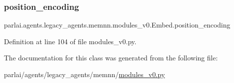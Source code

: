 \subsubsection{\texorpdfstring{position\+\_\+encoding}{position\_encoding}}
{\footnotesize\ttfamily parlai.\+agents.\+legacy\+\_\+agents.\+memnn.\+modules\+\_\+v0.\+Embed.\+position\+\_\+encoding}



Definition at line 104 of file modules\+\_\+v0.\+py.



The documentation for this class was generated from the following file\+:\begin{DoxyCompactItemize}
\item 
parlai/agents/legacy\+\_\+agents/memnn/\hyperlink{memnn_2modules__v0_8py}{modules\+\_\+v0.\+py}\end{DoxyCompactItemize}
